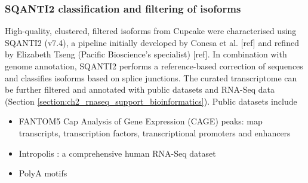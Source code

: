 \subsubsection{SQANTI2 classification and filtering of isoforms} 
\label{sec:sq_exp}
High-quality, clustered, filtered isoforms from Cupcake were characterised using SQANTI2 (v7.4), a pipeline initially developed by Conesa et al. [ref] and refined by Elizabeth Tseng (Pacific Bioscience’s specialist) [ref].
In combination with genome annotation, SQANTI2 performs a reference-based correction of sequences and classifies isoforms based on splice junctions. The curated transcriptome can be further filtered and annotated with public datasets and RNA-Seq data (Section \ref{section:ch2_rnaseq_support_bioinformatics}). Public datasets include 
\begin{itemize}
	\item FANTOM5 Cap Analysis of Gene Expression (CAGE) peaks: map transcripts, transcription factors, transcriptional promoters and enhancers
	\item Intropolis\cite{Nellore2016} : a comprehensive human RNA-Seq dataset
	\item PolyA motifs 
\end{itemize}


